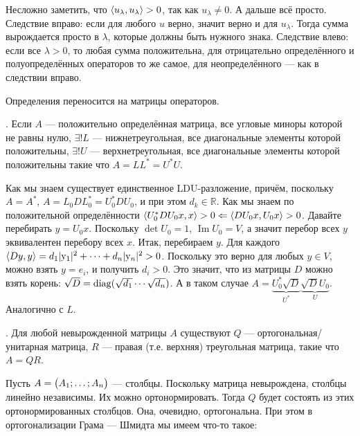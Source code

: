 \documentclass{article}
\DeclareMathOperator{\operIm}{Im}
\begin{document}
\begin{itemize}
\begin{Proof}
$$            $$
            Несложно заметить, что ${\left\langle{u_\lambda},{u_\lambda}\right\rangle}>0$, так как $u_\lambda\neq0$. А дальше всё просто. Следствие вправо: если для любого $u$ верно, значит верно и для $u_\lambda$. Тогда сумма вырождается просто в $\lambda$, которые должны быть нужного знака. Следствие влево: если все $\lambda>0$, то любая сумма положительна, для отрицательно определённого и полуопределённых операторов то же самое, для неопределённого --- как в следствии вправо.
        \end{Proof}
        \begin{Comment}
            Определения переносится на матрицы операторов.
        \end{Comment}
        \thm {}. Если $A$ --- положительно определённая матрица, все угловые миноры которой не равны нулю, $\exists!L$ --- нижнетреугольная, все диагональные элементы которой положительны, $\exists!U$ --- верхнетреугольная, все диагональные элементы которой положительны такие что $A=LL^*=U^*U$.
        \begin{Proof}
            Как мы знаем существует единственное LDU-разложение, причём, поскольку $A=A^*$, $A=L_0DL_0^*=U_0^*DU_0$, и при этом $d_k\in\mathbb R$. Как мы знаем по положительной определённости ${\left\langle{U_0^*DU_0x},{x}\right\rangle}>0\Leftarrow{\left\langle{DU_0x},{U_0x}\right\rangle}>0$. Давайте перебирать $y=U_0x$. Поскольку $\det U_0=1$, $\operIm U_0=V$, а значит перебор всех $y$ эквивалентен перебору всех $x$. Итак, перебираем $y$. Для каждого ${\left\langle{Dy},{y}\right\rangle}=d_1|\mathrm y_1|^2+\cdots+d_n|\mathrm y_n|^2>0$. Поскольку это верно для любых $y\in V$, можно взять $y=e_i$, и получить $d_i>0$. Это значит, что из матрицы $D$ можно взять корень: $\sqrt D=\operatorname{diag}(\sqrt{d_1}\cdots \sqrt{d_n})$. А в таком случае $A=\underbrace{U_0^*\sqrt D}_{U^*}\underbrace{\sqrt DU_0}_U$. Аналогично с $L$.
        \end{Proof}
        \thm {}. Для любой невырожденной матрицы $A$ существуют $Q$ --- ортогональная/унитарная матрица, $R$ --- правая (т.е. верхняя) треугольная матрица, такие что $A=QR$.
        \begin{Proof}
            Пусть $A=\left(\begin{matrix}A_1;\ldots;A_n\end{matrix}\right)$ --- столбцы. Поскольку матрица невырождена, столбцы линейно независимы. Их можно ортонормировать. Тогда $Q$ будет состоять из этих ортонормированных столбцов. Она, очевидно, ортогональна. При этом в ортогонализации Грама --- Шмидта мы имеем что-то такое:
            \[
            \begin{split}

\end{split}\]
\end{Proof}
\end{itemize}
\end{document}
